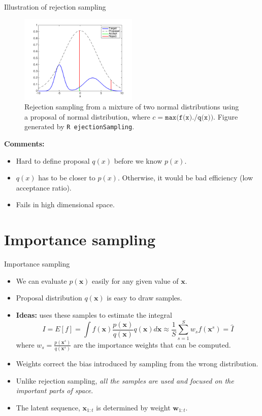 \documentclass[10pt,mathserif]{beamer}
\begin{document}
\begin{frame}{Illustration of rejection sampling}
\begin{figure}[h]
\centering
\includegraphics[width=0.5\textwidth]{rejectionSampling}
\caption{Rejection sampling from a mixture of two normal distributions using a proposal of normal distribution, where $c = \texttt{max(f(x)./q(x))}$. Figure generated by \texttt{R ejectionSampling}.}
\end{figure} 

\textbf{Comments:}
\begin{itemize}
    \item Hard to define proposal $q(x)$ before we know $p(x)$.
    \item $q(x)$ has to be closer to $p(x)$. Otherwise, it would be bad efficiency (low acceptance ratio).
    \item Fails in high dimensional space.
\end{itemize}
\end{frame}

\section{Importance sampling}
\begin{frame}{Importance sampling}
\begin{itemize}
    \item We can evaluate $p(\bm{x})$ easily for any given value of $\bm{x}$. 
    \item Proposal distribution $q(\bm{x})$ is easy to draw samples.
    \item \textbf{Ideas:} uses these samples to estimate the integral
    \begin{equation*} 
        I = E[f] = \int f(\bm{x})\frac{p(\bm{x})}{q(\bm{x})}q(\bm{x}) d\bm{x} \approx \frac{1}{S}\sum_{s=1}^S w_s f(\bm{x}^s)=\hat{I}
    \end{equation*} 
    where $w_s = \frac{p(\bm{x}^s)}{q(\bm{x}^s)}$ are the importance weights that can be computed.
    \item  Weights correct the bias introduced by sampling from the wrong distribution.
    \item Unlike rejection sampling, \textit{all the samples are used and focused on the important parts of space}.
    \item The latent sequence, $\bm{x}_{1:t}$ is determined by weight $\bm{w}_{1:t}$.
\end{itemize}    
\end{frame}
\end{document}
